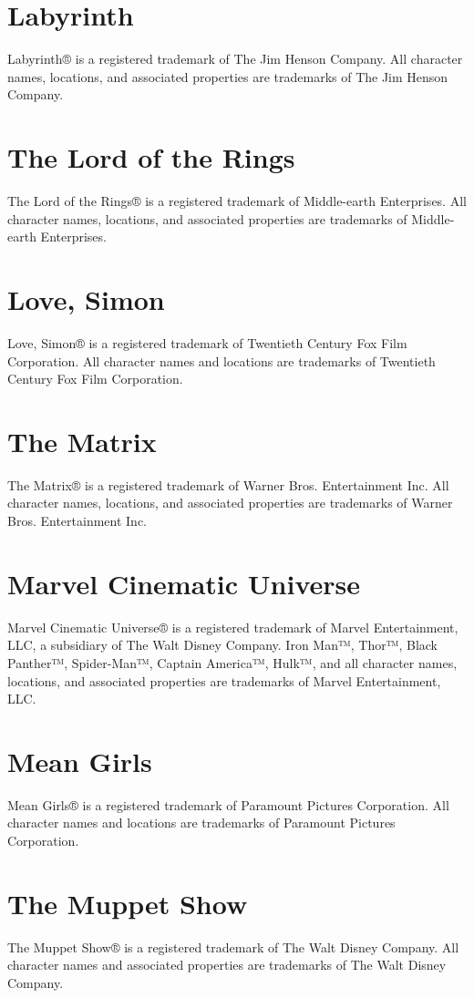 \documentclass[11pt,letterpaper,oldstylefigures]{memoir}
\begin{document}
\section{Labyrinth}
Labyrinth® is a registered trademark of The Jim Henson Company. All character names, locations, and associated properties are trademarks of The Jim Henson Company.

\section{The Lord of the Rings}
The Lord of the Rings® is a registered trademark of Middle-earth Enterprises. All character names, locations, and associated properties are trademarks of Middle-earth Enterprises.

\section{Love, Simon}
Love, Simon® is a registered trademark of Twentieth Century Fox Film Corporation. All character names and locations are trademarks of Twentieth Century Fox Film Corporation.

\section{The Matrix}
The Matrix® is a registered trademark of Warner Bros. Entertainment Inc. All character names, locations, and associated properties are trademarks of Warner Bros. Entertainment Inc.

\section{Marvel Cinematic Universe}
Marvel Cinematic Universe® is a registered trademark of Marvel Entertainment, LLC, a subsidiary of The Walt Disney Company. Iron Man™, Thor™, Black Panther™, Spider-Man™, Captain America™, Hulk™, and all character names, locations, and associated properties are trademarks of Marvel Entertainment, LLC.

\section{Mean Girls}
Mean Girls® is a registered trademark of Paramount Pictures Corporation. All character names and locations are trademarks of Paramount Pictures Corporation.

\section{The Muppet Show}
The Muppet Show® is a registered trademark of The Walt Disney Company. All character names and associated properties are trademarks of The Walt Disney Company.
\end{document}
